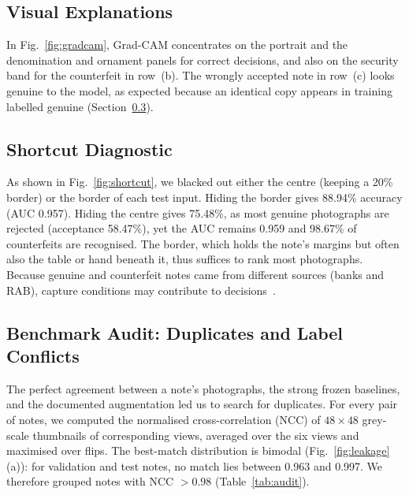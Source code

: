 \documentclass[journal]{IEEEtran}
\begin{document}
\subsection{Visual Explanations}
In Fig.~\ref{fig:gradcam}, Grad-CAM concentrates on the portrait and the denomination
and ornament panels for correct decisions, and also on the security band for the
counterfeit in row~(b). The wrongly accepted note in row~(c) looks genuine to the model, as expected because an
identical copy appears in training labelled genuine (Section~\ref{sec:audit}).

\subsection{Shortcut Diagnostic}
\label{sec:shortcut}
As shown in Fig.~\ref{fig:shortcut}, we blacked out either the centre (keeping a 20\%
border) or the border of each test input. Hiding the border gives 88.94\% accuracy (AUC 0.957). Hiding
the centre gives 75.48\%, as most genuine photographs are rejected (acceptance 58.47\%),
yet the AUC remains 0.959 and 98.67\% of counterfeits are recognised. The border, which
holds the note's margins but often also the table or hand beneath it, thus suffices to
rank most photographs.
Because genuine and counterfeit notes came from different sources (banks and RAB),
capture conditions may contribute to decisions~\cite{geirhos2020shortcut}.

\subsection{Benchmark Audit: Duplicates and Label Conflicts}
\label{sec:audit}
The perfect agreement between a note's photographs, the strong frozen baselines, and
the documented augmentation led us to search for duplicates. For every pair of notes,
we computed the normalised cross-correlation (NCC) of
$48\times48$ grey-scale thumbnails of corresponding views, averaged over the six views
and maximised over flips. The best-match distribution is bimodal
(Fig.~\ref{fig:leakage}(a)): for validation and test notes, no match lies between 0.963
and 0.997. We therefore grouped notes with NCC $>0.98$ (Table~\ref{tab:audit}).
\end{document}
